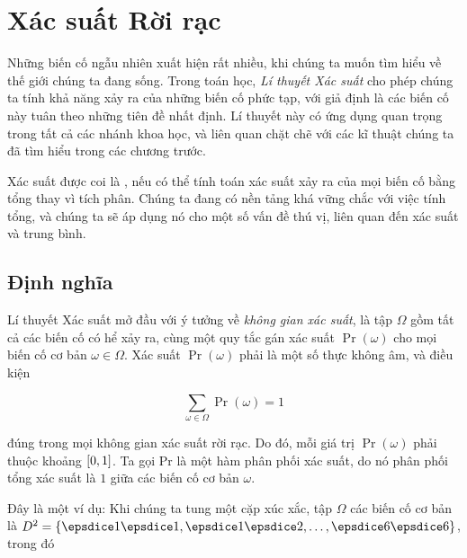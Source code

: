 \chapter{Xác suất Rời rạc}\label{ch:8}

Những biến cố ngẫu nhiên xuất hiện rất nhiều, khi chúng ta muốn tìm hiểu về thế giới chúng ta đang sống.
Trong toán học, \textit{Lí thuyết Xác suất} cho phép chúng ta tính khả năng xảy ra của những biến cố phức tạp, với giả định là các biến cố này tuân theo những tiên đề nhất định.
Lí thuyết này có ứng dụng quan trọng trong tất cả các nhánh khoa học, và liên quan chặt chẽ với các kĩ thuật chúng ta đã tìm hiểu trong các chương trước.

Xác suất được coi là , nếu có thể tính toán xác suất xảy ra của mọi biến cố bằng tổng thay vì tích phân.
Chúng ta đang có nền tảng khá vững chắc với việc tính tổng, và chúng ta sẽ áp dụng nó cho một số vấn đề thú vị, liên quan đến xác suất và trung bình.

\section{Định nghĩa}\label{sec:8.1}


Lí thuyết Xác suất mở đầu với ý tưởng về \textit{không gian xác suất}, là tập $\Omega$ gồm tất cả các biến cố có hể xảy ra, cùng một quy tắc gán xác suất $\Pr(\omega)$ cho mọi biến cố cơ bản $\omega \in \Omega$.
Xác suất $\Pr(\omega)$ phải là một số thực không âm, và điều kiện

\begin{equation}\label{eq:8.1}
    \sum_{\omega \in \Omega} \Pr(\omega) = 1
\end{equation}

đúng trong mọi không gian xác suất rời rạc.
Do đó, mỗi giá trị $\Pr(\omega)$ phải thuộc khoảng $\interval{0}{1}$.
Ta gọi Pr là một hàm phân phối xác suất, do nó phân phối tổng xác suất là $1$ giữa các biến cố cơ bản $\omega$.

Đây là một ví dụ: Khi chúng ta tung một cặp xúc xắc, tập $\Omega$ các biến cố cơ bản là $D^2 = \{ \vcdice{1} \vcdice{1}, \vcdice{1} \vcdice{2}, \text{\dots}, \vcdice{6} \vcdice{6} \}$, trong đó

